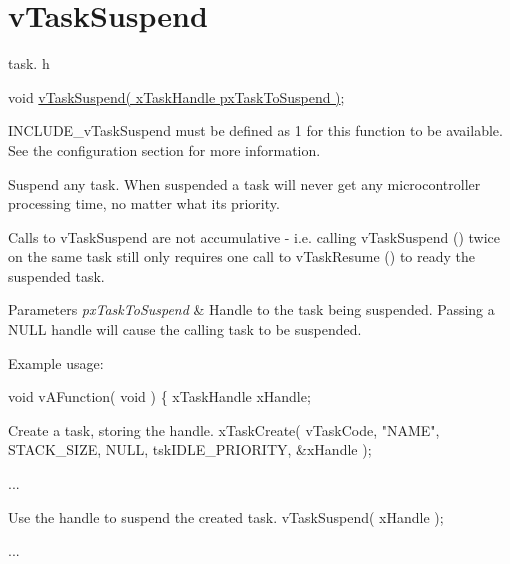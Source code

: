 \hypertarget{group__v_task_suspend}{\section{v\-Task\-Suspend}
\label{group__v_task_suspend}
}
task. h 
\begin{DoxyPre}void \hyperlink{win32_2win32_2_libraries_2_free_r_t_o_s_2_source_2tasks_8c_a5ff4e8e6b960afcc505c6427002526f6}{vTaskSuspend( xTaskHandle pxTaskToSuspend )};\end{DoxyPre}


I\-N\-C\-L\-U\-D\-E\-\_\-v\-Task\-Suspend must be defined as 1 for this function to be available. See the configuration section for more information.

Suspend any task. When suspended a task will never get any microcontroller processing time, no matter what its priority.

Calls to v\-Task\-Suspend are not accumulative -\/ i.\-e. calling v\-Task\-Suspend () twice on the same task still only requires one call to v\-Task\-Resume () to ready the suspended task.


\begin{DoxyParams}{Parameters}
{\em px\-Task\-To\-Suspend} & Handle to the task being suspended. Passing a N\-U\-L\-L handle will cause the calling task to be suspended.\\
\hline
\end{DoxyParams}
Example usage\-: 
\begin{DoxyPre}
 void vAFunction( void )
 \{
 xTaskHandle xHandle;\end{DoxyPre}



\begin{DoxyPre}Create a task, storing the handle.
         xTaskCreate( vTaskCode, "NAME", STACK\_SIZE, NULL, tskIDLE\_PRIORITY, \&xHandle );\end{DoxyPre}



\begin{DoxyPre}...\end{DoxyPre}



\begin{DoxyPre}Use the handle to suspend the created task.
         vTaskSuspend( xHandle );\end{DoxyPre}



\begin{DoxyPre}...\end{DoxyPre}




